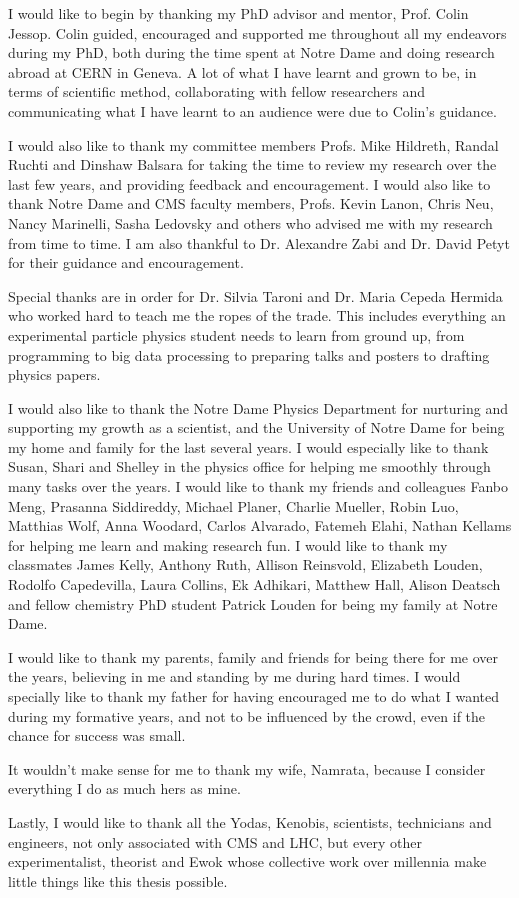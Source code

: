 \documentclass[final,numrefs,sort&compress]{nddiss2e}
\begin{document}
\begin{acknowledge}
  
  I would like to begin by thanking my PhD advisor and mentor, Prof. Colin Jessop. Colin guided, encouraged and supported me throughout all my endeavors during my PhD, both during the time spent at Notre Dame and doing research abroad at CERN in Geneva. A lot of what I have learnt and grown to be, in terms of scientific method, collaborating with fellow researchers and communicating what I have learnt to an audience were due to Colin's guidance.

  I would also like to thank my committee members Profs. Mike Hildreth, Randal Ruchti and Dinshaw Balsara for taking the time to review my research over the last few years, and providing feedback and encouragement. I would also like to thank Notre Dame and CMS faculty members, Profs. Kevin Lanon, Chris Neu, Nancy Marinelli, Sasha Ledovsky and others who advised me with my research from time to time. I am also thankful to Dr. Alexandre Zabi and Dr. David Petyt for their guidance and encouragement.

  Special thanks are in order for Dr. Silvia Taroni and Dr. Maria Cepeda Hermida who worked hard to teach me the ropes  of the trade. This includes everything an experimental particle physics student needs to learn from ground up, from programming to big data processing to preparing talks and posters to drafting physics papers.
  
  I would also like to thank the Notre Dame Physics Department for nurturing and supporting my growth as a scientist, and the University of Notre Dame for being my home and family for the last several years. I would especially like to thank Susan, Shari and Shelley in the physics office for helping me smoothly through many tasks over the years. I would like to thank my friends and colleagues Fanbo Meng, Prasanna Siddireddy, Michael Planer, Charlie Mueller, Robin Luo, Matthias Wolf, Anna Woodard, Carlos Alvarado, Fatemeh Elahi, Nathan Kellams for helping me learn and making research fun. I would like to thank my classmates James Kelly, Anthony Ruth, Allison Reinsvold, Elizabeth Louden, Rodolfo Capedevilla, Laura Collins, Ek Adhikari, Matthew Hall, Alison Deatsch and fellow chemistry PhD student Patrick Louden for being my family at Notre Dame.

  I would like to thank my parents, family and friends for being there for me over the years, believing in me and standing by me during hard times. I would specially like to thank my father for having encouraged me to do what I wanted during my formative years, and not to be influenced by the crowd, even if the chance for success was small.

  It wouldn't make sense for me to thank my wife, Namrata, because I consider everything I do as much hers as mine.
  
  Lastly, I would like to thank all the Yodas, Kenobis, scientists, technicians and engineers, not only associated with CMS and LHC, but every other experimentalist, theorist and Ewok whose collective work over millennia make little things like this thesis possible.
  
\end{acknowledge}
\end{document}
